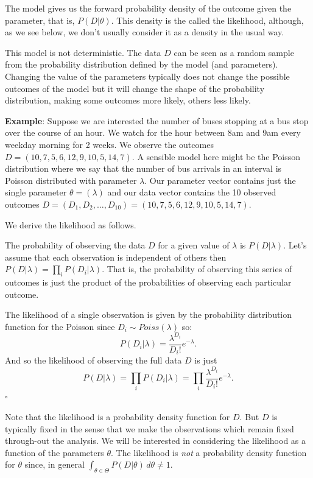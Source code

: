 \documentclass[11pt]{article}
\begin{document}
The model gives us the forward probability density of the outcome given the parameter, that is,  $P(D|\theta)$.   This density is the called the likelihood, although, as we see below, we don't usually consider it as a density in the usual way.

This model is not deterministic.  The data $D$ can be seen as a random sample from the probability distribution defined by the model (and parameters).  Changing the value of the parameters typically does not change the possible outcomes of the model but it  
will change the shape of the probability distribution, making some outcomes more likely, others less likely.



{\bf Example}: Suppose we are interested the number of buses stopping at a bus stop over the course of an hour.  We watch for the hour between 8am and 9am every weekday morning for  2 weeks.  We observe the outcomes  $D= (10 , 7 , 5 , 6 ,12 , 9 ,10 , 5 ,14  ,7)$.  A sensible model here might be the Poisson distribution where we say that the number of bus arrivals in an interval is Poisson distributed with parameter $\lambda$.  Our parameter vector contains just the single parameter $\theta = (\lambda)$ and our data vector contains the 10 observed outcomes $D = (D_1,D_2,\ldots,D_{10}) = (10 , 7 , 5 , 6 ,12 , 9 ,10 , 5 ,14  ,7)$.  

We derive the likelihood as follows.

The probability of observing the data $D$ for a given value of $\lambda$ is $P(D|\lambda)$. Let's assume that each observation is independent of others then $P(D|\lambda) = \prod_{i}P(D_i|\lambda)$.  That is, the probability of observing this series of outcomes is just the product of the probabilities of observing each particular outcome.  

The likelihood of a single observation is given by the probability distribution function for the Poisson since $D_i \sim Poiss(\lambda)$ so:   \[P(D_i|\lambda) = \frac{\lambda^{D_i}}{D_i!} e^{-\lambda}. \]
And so the likelihood of observing the full data $D$ is just 
\[
P(D|\lambda) = \prod_{i}P(D_i|\lambda) = \prod_{i}  \frac{\lambda^{D_i}}{D_i!} e^{-\lambda}. 
\]
\hfill $\square$


 
Note that the likelihood is a probability density function for $D$.  But $D$ is typically fixed in the sense that we make the observations which remain fixed through-out the analysis.  We will be interested in considering the likelihood as a function of the parameters $\theta$.  The likelihood is {\em not} a probability density function for $\theta$ since, in general $\int_{\theta \in \Theta} P(D|\theta) \, d\theta \neq 1$.
\end{document}
